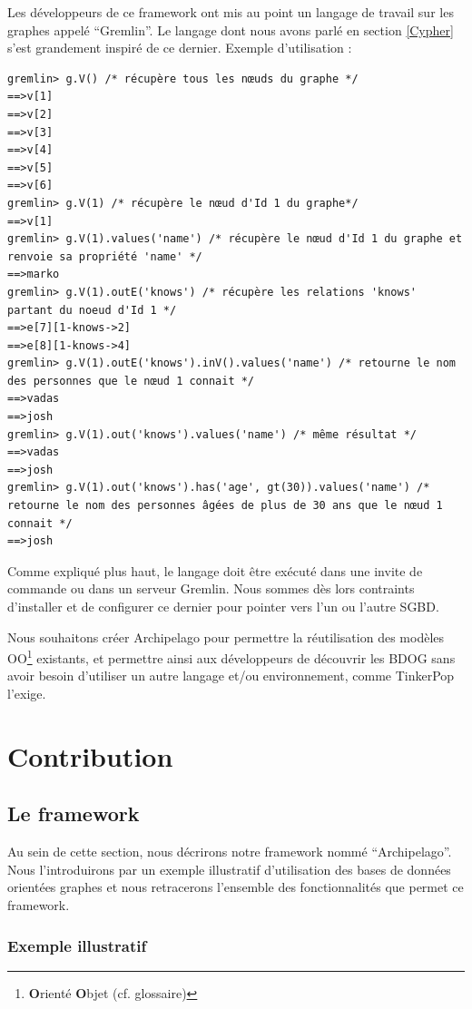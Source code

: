 \documentclass[a4paper,fleqn,12pt,oneside]{book}
\begin{document}
Les développeurs de ce framework ont mis au point un langage de travail sur les graphes appelé \enquote{Gremlin}. Le langage dont nous avons parlé en section \ref{Cypher} s’est grandement inspiré de ce dernier\cite{tinkerPopSite}.
\newpage
Exemple d'utilisation :

\begin{lstlisting}
gremlin> g.V() /* récupère tous les nœuds du graphe */
==>v[1]
==>v[2]
==>v[3]
==>v[4]
==>v[5]
==>v[6]
gremlin> g.V(1) /* récupère le nœud d'Id 1 du graphe*/
==>v[1]
gremlin> g.V(1).values('name') /* récupère le nœud d'Id 1 du graphe et renvoie sa propriété 'name' */
==>marko
gremlin> g.V(1).outE('knows') /* récupère les relations 'knows' partant du noeud d'Id 1 */
==>e[7][1-knows->2]
==>e[8][1-knows->4]
gremlin> g.V(1).outE('knows').inV().values('name') /* retourne le nom des personnes que le nœud 1 connait */
==>vadas
==>josh
gremlin> g.V(1).out('knows').values('name') /* même résultat */
==>vadas
==>josh
gremlin> g.V(1).out('knows').has('age', gt(30)).values('name') /* retourne le nom des personnes âgées de plus de 30 ans que le nœud 1 connait */
==>josh
\end{lstlisting}

Comme expliqué plus haut, le langage doit être exécuté dans une invite de commande ou dans un serveur Gremlin. Nous sommes dès lors contraints d’installer et de configurer ce dernier pour pointer vers l’un ou l’autre SGBD.

Nous souhaitons créer Archipelago pour permettre la réutilisation des modèles OO\footnote{\textbf{O}rienté \textbf{O}bjet (cf. glossaire)} existants, et permettre ainsi aux développeurs de découvrir les BDOG sans avoir besoin d'utiliser un autre langage et/ou environnement, comme TinkerPop l'exige.



\part{Contribution}
\chapter{Le framework}

Au sein de cette section, nous décrirons notre framework nommé \enquote{Archipelago}. Nous l'introduirons par un exemple illustratif d'utilisation des bases de données orientées graphes et nous retracerons l'ensemble des fonctionnalités que permet ce framework.

\section{Exemple illustratif}
\end{document}
